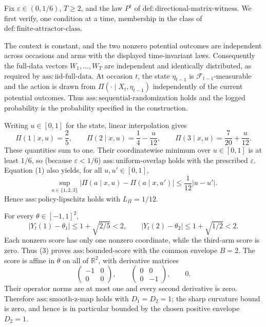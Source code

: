 Fix \(\varepsilon\in(0,1/6)\), \(T\ge2\), and the law \(P^{\dagger}\) of \(\mathrm{def:directional\text{-}matrix\text{-}witness}\). We first verify, one condition at a time, membership in the class of \(\mathrm{def:finite\text{-}attractor\text{-}class}\).

The context is constant, and the two nonzero potential outcomes are independent across occasions and arms with the displayed time-invariant laws. Consequently the full-data vectors \(W_1,\ldots,W_T\) are independent and identically distributed, as required by \(\mathrm{ass:iid\text{-}full\text{-}data}\). At occasion \(t\), the state \(\eta_{t-1}\) is \(\mathcal F_{t-1}\)-measurable and the action is drawn from \(\Pi(\cdot\mid X_t,\eta_{t-1})\) independently of the current potential outcomes. Thus \(\mathrm{ass:sequential\text{-}randomization}\) holds and the logged probability is the probability specified in the construction.

Writing \(u\in[0,1]\) for the state, linear interpolation gives
\[
 \Pi(1\mid x,u)=\frac25,\qquad
 \Pi(2\mid x,u)=\frac14-\frac{u}{12},\qquad
 \Pi(3\mid x,u)=\frac7{20}+\frac{u}{12}.
 \tag{1}
\]
These quantities sum to one. Their coordinatewise minimum over \(u\in[0,1]\) is at least \(1/6\), so (because \(\varepsilon<1/6\)) \(\mathrm{ass:uniform\text{-}overlap}\) holds with the prescribed \(\varepsilon\). Equation (1) also yields, for all \(u,u'\in[0,1]\),
\[
 \sup_{a\in\{1,2,3\}}\left|\Pi(a\mid x,u)-\Pi(a\mid x,u')\right|
 \le \frac1{12}|u-u'|.
 \tag{2}
\]
Hence \(\mathrm{ass:policy\text{-}lipschitz}\) holds with \(L_\Pi=1/12\).

For every \(\theta\in[-1,1]^2\),
\[
 |Y_t(1)-\theta_1|\le1+\sqrt{2/5}<2,
 \qquad
 |Y_t(2)-\theta_2|\le1+\sqrt{1/2}<2.
 \tag{3}
\]
Each nonzero score has only one nonzero coordinate, while the third-arm score is zero. Thus (3) proves \(\mathrm{ass:bounded\text{-}score}\) with the common envelope \(B=2\). The score is affine in \(\theta\) on all of \(\mathbb R^2\), with derivative matrices
\[
 \begin{pmatrix}-1&0\\0&0\end{pmatrix},
 \qquad
 \begin{pmatrix}0&0\\0&-1\end{pmatrix},
 \qquad 0.
\]
Their operator norms are at most one and every second derivative is zero. Therefore \(\mathrm{ass:smooth\text{-}z\text{-}map}\) holds with \(D_1=D_2=1\); the sharp curvature bound is zero, and hence is in particular bounded by the chosen positive envelope \(D_2=1\).


